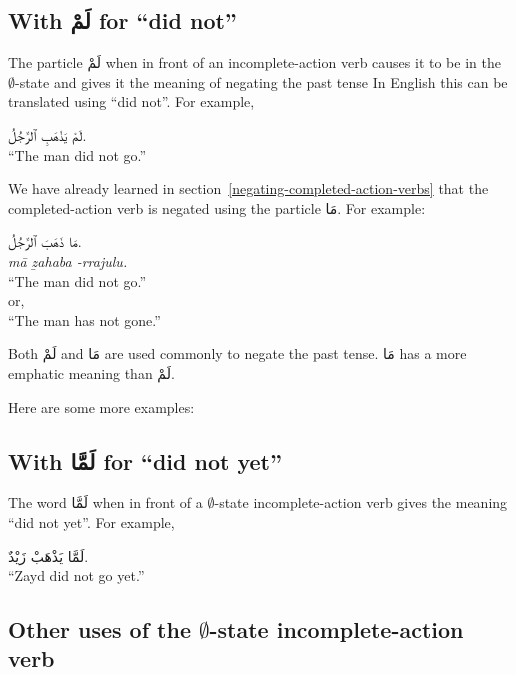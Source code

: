 \documentclass[
  10pt,
]{book}
\begin{document}
\subsection{\texorpdfstring{With \foreignlanguage{arabic}{لَمْ} for \enquote{did not}}{With لَمْ for ``did not''}}\label{with-ux644ux645-for-did-not}

The particle \foreignlanguage{arabic}{لَمْ} when in front of an
incomplete-action verb
causes it to be in the
\(\emptyset\)-state
and gives it the meaning of
negating the past tense
In English this can be translated using \enquote{did not}.
For example,

\foreignlanguage{arabic}{لَمْ يَذْهَبِ ٱلرَّجُلُ.}\\
\enquote{The man did not go.}

We have already learned in
section~\ref{negating-completed-action-verbs} that the completed-action verb is negated using the particle \foreignlanguage{arabic}{مَا}. For example:

\foreignlanguage{arabic}{مَا ذَهَبَ ٱلرَّجُلُ.}\\
\emph{mā ẕahaba -rrajulu.}\\
\enquote{The man did not go.}\\
or,\\
\enquote{The man has not gone.}

Both \foreignlanguage{arabic}{لَمْ} and \foreignlanguage{arabic}{مَا} are used commonly to negate the past tense.
\foreignlanguage{arabic}{مَا} has a more emphatic meaning than \foreignlanguage{arabic}{لَمْ}.

Here are some more examples:

\subsection{\texorpdfstring{With \foreignlanguage{arabic}{لَمَّا} for \enquote{did not yet}}{With لَمَّا for ``did not yet''}}\label{with-ux644ux645ux627-for-did-not-yet}

The word \foreignlanguage{arabic}{لَمَّا} when in front of a
\(\emptyset\)-state
incomplete-action verb
gives the meaning \enquote{did not yet}.
For example,

\foreignlanguage{arabic}{لَمَّا يَذْهَبْ زَيْدٌ.}\\
\enquote{Zayd did not go yet.}

\subsection{\texorpdfstring{Other uses of the \(\emptyset\)-state incomplete-action verb}{Other uses of the \textbackslash emptyset-state incomplete-action verb}}\label{other-uses-of-the-emptyset-state-incomplete-action-verb}
\end{document}
